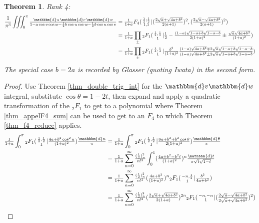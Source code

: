 \documentclass[12pt]{article}
\newcommand{\dd}[0] {\mathbbm{d}}
\numberwithin{equation}{section}
\newtheorem{theorem}{Theorem}[section]
\newcommand{\Head}[3] {{}_{#1}{#2}_{#3}}
\newcommand{\ArgS}[3] {( \begin{smallmatrix} #1 \\ #2 \end{smallmatrix} | {#3})}
\newcommand{\ArgKS}[1] {\ArgS{\frac12,\frac12}{1}{#1}}
\newcommand{\appellFfourS}[6]    {F_4 \ArgS{{#1};{#2}}{{#3},{#4}}{{#5},{#6}}}
\begin{document}
\begin{theorem} Rank 4:
\begin{align*}
\frac{1}{\pi^3} \iiint_0^{\pi} \tfrac{\dd u \, \dd v \, \dd w} {1 - a \cos v \cos w - \frac12 b \cos u \cos w - \frac12 b \cos u \cos v}
&= \tfrac{1}{1+a} \appellFfourS{\frac12}{\frac12}{1}{1}{(\tfrac{2\sqrt{a}+\sqrt{4 a+b^2}}{2(a+1)})^2}{(\tfrac{2 \sqrt{a}-\sqrt{4 a+b^2}}{2(a+1)})^2}\\
&= \tfrac{1}{1+a} \prod_{\pm} \Head{2}{F}{1} \ArgKS{\tfrac{1}{2}-\tfrac{(1-a)\sqrt{1-a+b}\sqrt{1-a-b}}{2(1+a)^2} \pm \tfrac{\sqrt{a}\sqrt{4a+ b^2}}{(1+a)^2}}\\
&= \tfrac{1}{1+a} \prod_{\pm} \Head{2}{F}{1} \ArgS{\frac14,\frac14}{1}{ \tfrac{b^2}{(1+a)^2} \tfrac{(1-a)\sqrt{4a+b^2} \mp 2 \sqrt{a}\sqrt{1-a+b}\sqrt{1-a-b}}{(1-a)\sqrt{4a+b^2} \pm 2 \sqrt{a}\sqrt{1-a+b}\sqrt{1-a-b}} }
\end{align*}
The special case $b = 2a$ is recorded by Glasser (quoting Iwata) in the second form.
\end{theorem}
\begin{proof}
Use Theorem \ref{thm_double_trig_int} for the $\dd v \dd w$ integral, substitute $\cos \theta = 1-2t$, then expand and apply a quadratic transformation of the $\Head2F1$ to get to a polynomial where Theorem \ref{thm_appelF4_sum} can be used to get to an $F_4$ to which Theorem \ref{thm_f4_reduce} applies.
\begin{align*}
\tfrac{1}{1+a} \int_{0}^{\pi} \Head2F1 \ArgKS{\tfrac{4a+b^2 \cos^2 u}{(1+a)^2}} \tfrac{\dd u}{\pi}
&= \tfrac{1}{1+a} \int_{0}^{\pi} \Head2F1 \ArgKS{\tfrac{8a+b^2+b^2 \cos \theta}{2(1+a)^2}} \tfrac{\dd \theta}{\pi}\\
&= \tfrac{1}{1+a} \sum_{n=0}^{\infty} \tfrac{(\frac12)_n^2}{n!^2}\int_{0}^{1} (\tfrac{4a+b^2-b^2 t}{(1+a)^2})^n \tfrac{\dd t}{\pi \sqrt{t}\sqrt{1-t}}\\
&= \tfrac{1}{1+a} \sum_{n=0}^{\infty} \tfrac{(\frac12)_n^2}{n!^2}(\tfrac{4a+b^2}{(1+a)^2})^n \Head2F1 \ArgS{-n,\frac12}{1}{\tfrac{b^2}{4a+b^2}}\\
&= \tfrac{1}{1+a} \sum_{n=0}^{\infty} \tfrac{(\frac12)_n^2}{n!^2}(\tfrac{2\sqrt{a} + \sqrt{4a+b^2}}{2(1+a)})^{2n} \Head2F1 \ArgS{-n,-n}{1}{(\tfrac{2\sqrt{a} - \sqrt{4a+b^2}}{2\sqrt{a} + \sqrt{4a+b^2}})^2}
\end{align*}
\end{proof}
\end{document}
